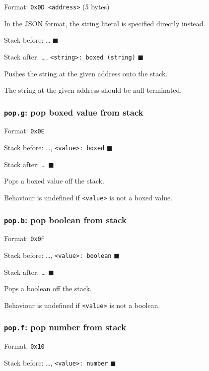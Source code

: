 Format: \texttt{0x0D\ \textless{}address\textgreater{}} (5 bytes)

In the JSON format, the string literal is specified directly instead.

Stack before: \ldots{} \(\blacksquare\)

Stack after: \ldots,
\texttt{\textless{}string\textgreater{}:\ boxed\ (string)}
\(\blacksquare\)

Pushes the string at the given address onto the stack.

The string at the given address should be null-terminated.

\subsubsection{\texorpdfstring{\texttt{pop.g}: pop boxed value from
stack}{pop.g: pop boxed value from stack}}

Format: \texttt{0x0E}

Stack before: \ldots, \texttt{\textless{}value\textgreater{}:\ boxed}
\(\blacksquare\)

Stack after: \ldots{} \(\blacksquare\)

Pops a boxed value off the stack.

Behaviour is undefined if \texttt{\textless{}value\textgreater{}} is not
a boxed value.

\subsubsection{\texorpdfstring{\texttt{pop.b}: pop boolean from
stack}{pop.b: pop boolean from stack}}

Format: \texttt{0x0F}

Stack before: \ldots, \texttt{\textless{}value\textgreater{}:\ boolean}
\(\blacksquare\)

Stack after: \ldots{} \(\blacksquare\)

Pops a boolean off the stack.

Behaviour is undefined if \texttt{\textless{}value\textgreater{}} is not
a boolean.

\subsubsection{\texorpdfstring{\texttt{pop.f}: pop number from
stack}{pop.f: pop number from stack}}

Format: \texttt{0x10}

Stack before: \ldots, \texttt{\textless{}value\textgreater{}:\ number}
\(\blacksquare\)

